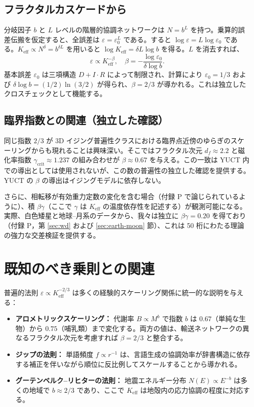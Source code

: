 \documentclass[11pt,a4paper]{article}
\newcommand{\Keff}{K_{\mathrm{eff}}}
\newcommand{\eps}{\varepsilon}
\begin{document}
	\subsection*{フラクタルカスケードから}
	分岐因子 \(b\) と \(L\) レベルの階層的協調ネットワークは \(N = b^L\) を持つ。乗算的誤差伝搬を仮定すると、全誤差は \(\eps = \eps_0^{L}\) である。すると \(\log \eps = L \log \eps_0\) である。\(\Keff \propto N^{\delta} = b^{\delta L}\) を用いると \(\log \Keff = \delta L \log b\) を得る。\(L\) を消去すれば、
	\[
	\eps \propto \Keff^{-\beta}, \quad \beta = -\frac{\log \eps_0}{\delta \log b}.
	\]
	基本誤差 \(\eps_0\) は三項構造 \(D+I\!\cdot\!R\) によって制限され、計算により \(\eps_0 = 1/3\) および \(\delta \log b = (1/2)\ln(3/2)\) が得られ、\(\beta = 2/3\) が導かれる。これは独立したクロスチェックとして機能する。
	
	\subsection*{臨界指数との関連（独立した確認）}
	同じ指数 \(2/3\) が 3D イジング普遍性クラスにおける臨界点近傍のゆらぎのスケーリングからも現れることは興味深い。そこではフラクタル次元 \(d_f \approx 2.2\) と磁化率指数 \(\gamma_{\mathrm{crit}} \approx 1.237\) の組み合わせが \(\beta \approx 0.67\) を与える。この一致は YUCT 内での導出としては使用されないが、この数の普遍性の独立した確認を提供する。YUCT の \(\beta\) の導出はイジングモデルに依存しない。
	
	さらに、相転移が有効重力定数の変化を含む場合（付録 P で論じられているように）、積 \(\beta\gamma\)（ここで \(\gamma\) は \(K_{\mathrm{eff}}\) の温度依存性を記述する）が観測可能になる。実際、白色矮星と地球–月系のデータから、我々は独立に \(\beta\gamma = 0.20\) を得ており（付録 P，第 \ref{sec:wd} および \ref{sec:earth-moon} 節）、これは 50 桁にわたる理論の強力な交差検証を提供する。
	
	\section{既知のべき乗則との関連}
	\label{sec:connections}
	
	普遍的法則 \(\eps \propto \Keff^{-2/3}\) は多くの経験的スケーリング関係に統一的な説明を与える：
	
	\begin{itemize}
		\item \textbf{アロメトリックスケーリング：} 代謝率 \(B \propto M^{b}\) で指数 \(b\) は \(0.67\)（単純な生物）から \(0.75\)（哺乳類）まで変化する。両方の値は、輸送ネットワークの異なるフラクタル次元を考慮すれば \(\beta = 2/3\) と整合する。
		\item \textbf{ジップの法則：} 単語頻度 \(f \propto r^{-1}\) は、言語生成の協調効率が辞書構造に依存する補正を伴いながら順位に反比例してスケールすることから導かれる。
		\item \textbf{グーテンベルク–リヒターの法則：} 地震エネルギー分布 \(N(E) \propto E^{-b}\) は多くの地域で \(b \approx 2/3\) であり、ここで \(\Keff\) は地殻内の応力協調の程度に対応する。
	\end{itemize}
	
\end{document}
